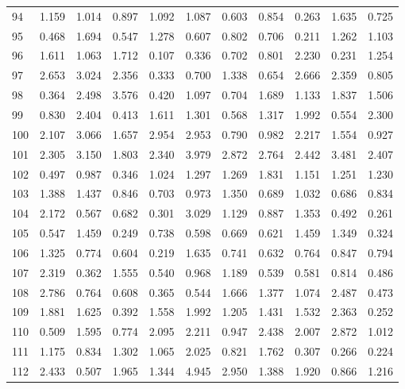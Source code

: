 \begin{tabular}{lrrrrrrrrrr}
94  &  1.159 &  1.014 &  0.897 &  1.092 &  1.087 &  0.603 &  0.854 &  0.263 &  1.635 &  0.725 \\
95  &  0.468 &  1.694 &  0.547 &  1.278 &  0.607 &  0.802 &  0.706 &  0.211 &  1.262 &  1.103 \\
96  &  1.611 &  1.063 &  1.712 &  0.107 &  0.336 &  0.702 &  0.801 &  2.230 &  0.231 &  1.254 \\
97  &  2.653 &  3.024 &  2.356 &  0.333 &  0.700 &  1.338 &  0.654 &  2.666 &  2.359 &  0.805 \\
98  &  0.364 &  2.498 &  3.576 &  0.420 &  1.097 &  0.704 &  1.689 &  1.133 &  1.837 &  1.506 \\
99  &  0.830 &  2.404 &  0.413 &  1.611 &  1.301 &  0.568 &  1.317 &  1.992 &  0.554 &  2.300 \\
100 &  2.107 &  3.066 &  1.657 &  2.954 &  2.953 &  0.790 &  0.982 &  2.217 &  1.554 &  0.927 \\
101 &  2.305 &  3.150 &  1.803 &  2.340 &  3.979 &  2.872 &  2.764 &  2.442 &  3.481 &  2.407 \\
102 &  0.497 &  0.987 &  0.346 &  1.024 &  1.297 &  1.269 &  1.831 &  1.151 &  1.251 &  1.230 \\
103 &  1.388 &  1.437 &  0.846 &  0.703 &  0.973 &  1.350 &  0.689 &  1.032 &  0.686 &  0.834 \\
104 &  2.172 &  0.567 &  0.682 &  0.301 &  3.029 &  1.129 &  0.887 &  1.353 &  0.492 &  0.261 \\
105 &  0.547 &  1.459 &  0.249 &  0.738 &  0.598 &  0.669 &  0.621 &  1.459 &  1.349 &  0.324 \\
106 &  1.325 &  0.774 &  0.604 &  0.219 &  1.635 &  0.741 &  0.632 &  0.764 &  0.847 &  0.794 \\
107 &  2.319 &  0.362 &  1.555 &  0.540 &  0.968 &  1.189 &  0.539 &  0.581 &  0.814 &  0.486 \\
108 &  2.786 &  0.764 &  0.608 &  0.365 &  0.544 &  1.666 &  1.377 &  1.074 &  2.487 &  0.473 \\
109 &  1.881 &  1.625 &  0.392 &  1.558 &  1.992 &  1.205 &  1.431 &  1.532 &  2.363 &  0.252 \\
110 &  0.509 &  1.595 &  0.774 &  2.095 &  2.211 &  0.947 &  2.438 &  2.007 &  2.872 &  1.012 \\
111 &  1.175 &  0.834 &  1.302 &  1.065 &  2.025 &  0.821 &  1.762 &  0.307 &  0.266 &  0.224 \\
112 &  2.433 &  0.507 &  1.965 &  1.344 &  4.945 &  2.950 &  1.388 &  1.920 &  0.866 &  1.216 \\

\end{tabular}
